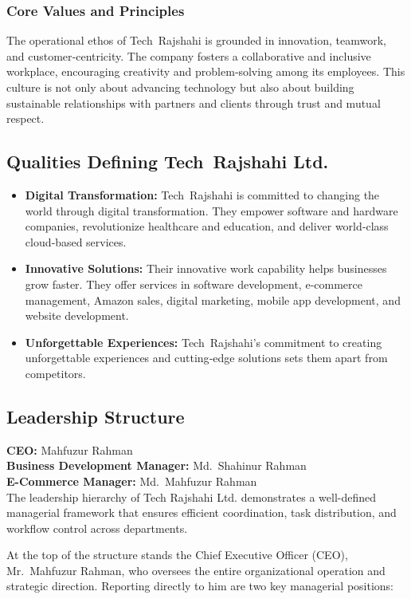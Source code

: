 \documentclass[12pt,a4paper]{article}
\begin{document}
\subsubsection{Core Values and Principles}
The operational ethos of Tech Rajshahi is grounded in innovation, teamwork, and customer‑centricity.  The company fosters a collaborative and inclusive workplace, encouraging creativity and problem‑solving among its employees.  This culture is not only about advancing technology but also about building sustainable relationships with partners and clients through trust and mutual respect.

\subsection{Qualities Defining Tech Rajshahi Ltd.}
\begin{itemize}
    \item \textbf{Digital Transformation:} Tech Rajshahi is committed to changing the world through digital transformation. They empower software and hardware companies, revolutionize healthcare and education, and deliver world‑class cloud‑based services.
    \item \textbf{Innovative Solutions:} Their innovative work capability helps businesses grow faster. They offer services in software development, e‑commerce management, Amazon sales, digital marketing, mobile app development, and website development.
    \item \textbf{Unforgettable Experiences:} Tech Rajshahi’s commitment to creating unforgettable experiences and cutting‑edge solutions sets them apart from competitors.
\end{itemize}

\subsection{Leadership Structure}

\textbf{CEO:} Mahfuzur Rahman \\
\textbf{Business Development Manager:} Md.\ Shahinur Rahman \\
\textbf{E-Commerce Manager:} Md.\ Mahfuzur Rahman \\[0.4cm]

The leadership hierarchy of Tech Rajshahi Ltd. demonstrates a well-defined managerial framework that ensures efficient coordination, task distribution, and workflow control across departments.

At the top of the structure stands the Chief Executive Officer (CEO), Mr.\ Mahfuzur Rahman, who oversees the entire organizational operation and strategic direction. Reporting directly to him are two key managerial positions:
\end{document}
